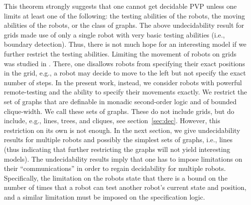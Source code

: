 This theorem strongly suggests that one cannot get decidable PVP unless one limits at least one of the following: the testing abilities of the robots, the moving abilities of the robots, or the class of graphs. The above undecidability result for grids made use of only a single robot with very basic testing abilities (i.e., boundary detection). Thus, there is not much hope for an interesting model if we further restrict the testing abilities. Limiting the movement of robots on grids was studied in \cite{AAMAS16Grids}. There, one disallows robots from specifying their exact positions in the grid, e.g., a robot may decide to move to the left but not specify the exact number of steps. In the present work, instead, we consider robots with powerful remote-testing and the ability to specify their movements exactly. We restrict the set of graphs that are definable in monadic second-order logic and of bounded clique-width. We call these \courcellian sets of graphs. These do not include grids, but do include, e.g., lines, trees, and cliques, see section~\ref{sec:dec}.
However, this restriction on its own is not enough.
In the next section, we give undecidability results for multiple robots and possibly the simplest sets of \courcellian graphs, i.e.,
lines (thus indicating that further restricting the graphs will not yield interesting models).
The undecidability results imply that one has to impose limitations on their
``communications'' in order to regain decidability for multiple robots.
Specifically, the limitation on the robots state that there
is a bound on the number of times that a robot can test another robot's current
state and position, and a similar limitation must
be imposed on the specification logic.

